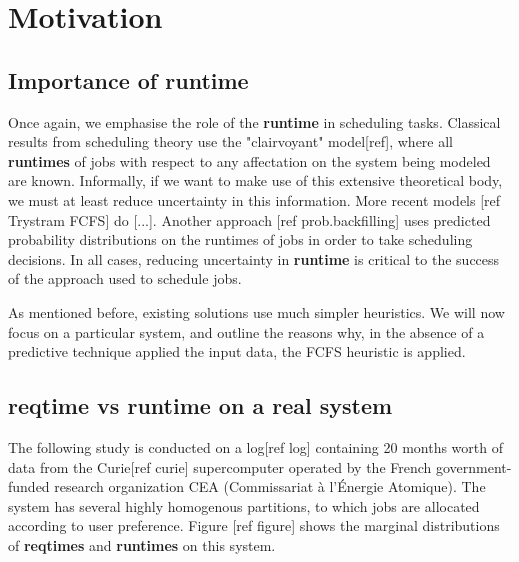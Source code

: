 \documentclass{article}
\begin{document}
\section{Motivation}

\subsection{Importance of \textbf{runtime}}
\label{sub:importance_of_runtime}
Once again, we emphasise the role of the \textbf{runtime} in scheduling tasks. Classical results from scheduling theory use the "clairvoyant" model[ref], where all \textbf{runtimes} of jobs with respect to any affectation on the system being modeled are known.
Informally, if we want to make use of this extensive theoretical body, we must at least reduce uncertainty in this information.
More recent models [ref Trystram FCFS] do [...].
Another approach [ref prob.backfilling] uses predicted probability distributions on the runtimes of jobs in order to take scheduling decisions.
In all cases, reducing uncertainty in \textbf{runtime} is critical to the success of the approach used to schedule jobs.

As mentioned before, existing solutions use much simpler heuristics. We will now focus on a particular system, and outline the reasons why, in the absence of a predictive technique applied the input data, the FCFS heuristic is applied.

\subsection{\textbf{reqtime} vs \textbf{runtime} on a real system}
\label{sub:reqtime_vs_runtime_on_a_real_system}
The following study is conducted on a log[ref log] containing 20 months worth of data from the Curie[ref curie] supercomputer operated by the French government-funded research organization CEA (Commissariat à l'Énergie Atomique).
The system has several highly homogenous partitions, to which jobs are allocated according to user preference.
Figure [ref figure] shows the marginal distributions of \textbf{reqtimes} and \textbf{runtimes} on this system.
\end{document}
